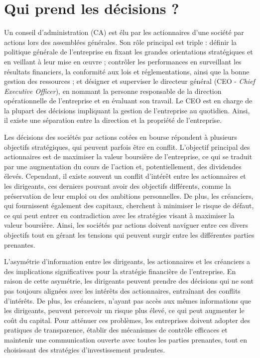 \documentclass[a4paper, 12pt]{report}
\begin{document}
\section{Qui prend les décisions ?}
	
Un conseil d'administration (CA) est élu par les actionnaires d'une société par actions lors des assemblées générales. Son rôle principal est triple : définir la politique générale de l'entreprise en fixant les grandes orientations stratégiques et en veillant à leur mise en œuvre ; contrôler les performances en surveillant les résultats financiers, la conformité aux lois et réglementations, ainsi que la bonne gestion des ressources ; et désigner et superviser le directeur général (CEO - \textit{Chief Executive Officer}), en nommant la personne responsable de la direction opérationnelle de l'entreprise et en évaluant son travail. Le CEO est en charge de la plupart des décisions impliquant la gestion de l'entreprise au quotidien. Ainsi, il existe une séparation entre la direction et la propriété de l'entreprise.
	
Les décisions des sociétés par actions cotées en bourse répondent à plusieurs objectifs stratégiques, qui peuvent parfois être en conflit. L'objectif principal des actionnaires est de maximiser la valeur boursière de l'entreprise, ce qui se traduit par une augmentation du cours de l'action et, potentiellement, des dividendes élevés. Cependant, il existe souvent un conflit d'intérêt entre les actionnaires et les dirigeants, ces derniers pouvant avoir des objectifs différents, comme la préservation de leur emploi ou des ambitions personnelles. De plus, les créanciers, qui fournissent également des capitaux, cherchent à minimiser le risque de défaut, ce qui peut entrer en contradiction avec les stratégies visant à maximiser la valeur boursière. Ainsi, les sociétés par actions doivent naviguer entre ces divers objectifs tout en gérant les tensions qui peuvent surgir entre les différentes parties prenantes.

L'asymétrie d'information entre les dirigeants, les actionnaires et les créanciers a des implications significatives pour la stratégie financière de l'entreprise. En raison de cette asymétrie, les dirigeants peuvent prendre des décisions qui ne sont pas toujours alignées avec les intérêts des actionnaires, entraînant des conflits d'intérêts. De plus, les créanciers, n'ayant pas accès aux mêmes informations que les dirigeants, peuvent percevoir un risque plus élevé, ce qui peut augmenter le coût du capital. Pour atténuer ces problèmes, les entreprises doivent adopter des pratiques de transparence, établir des mécanismes de contrôle efficaces et maintenir une communication ouverte avec toutes les parties prenantes, tout en choisissant des stratégies d'investissement prudentes.
\end{document}
